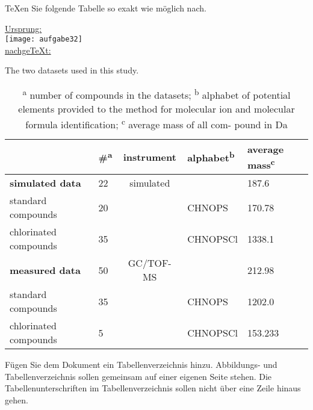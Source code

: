 \pagebreak
\begin{aufgabe}
\TeX en Sie folgende Tabelle so exakt wie m\"oglich nach.		
\end{aufgabe}
\FloatBarrier
\noindent \underline{Ursprung:} \\
\noindent\texttt{[image: aufgabe32]}
\\
\noindent \underline{nachge\TeX t:}\\
\indent
\begin{table}
\caption{The two datasets used in this study.}
\caption*{
\textsuperscript{a}\hspace{-1mm} number of compounds in the datasets; 
\textsuperscript{b}\hspace{-1mm} alphabet of potential elements provided 
				 to the method for molecular ion and molecular formula identification; 
\textsuperscript{c}\hspace{-1mm} average mass of all com- \-pound in Da 
}
\hspace*{0.48cm}
\begin{tabularx}{0.91\textwidth}{llcle{2}}
 \toprule 
				       & \#\textsuperscript{a} 
				       & instrument 
				       & alphabet\textsuperscript{b} 
				       & \textrm{average mass}\textsuperscript{c}\\
 \midrule
 \textbf{simulated data} 	       & 22	    & simulated  &              &  187.6\\
 \hspace{0.41cm} standard compounds    & 20	    & 		 & CHNOPS	& 170.78\\
 \hspace{0.41cm} chlorinated compounds & 35	    &            & CHNOPSCl     & 1338.1\\
 \midrule
 \textbf{measured data}	       	       & 50         & GC/TOF-MS  & 		& 212.98\\
 \hspace{0.41cm} standard compounds    & 35         & 		 & CHNOPS	& 1202.0\\
 \hspace{0.41cm} chlorinated compounds & 5	    &            & CHNOPSCl     & 153.233\\
 \bottomrule 
  \end{tabularx}
\end{table}

\pagebreak
\begin{aufgabe}
F\"ugen Sie dem Dokument ein Tabellenverzeichnis hinzu. Abbildungs- und Tabellenverzeichnis sollen gemeinsam auf einer eigenen Seite stehen. Die Tabellenunterschriften im Tabellenverzeichnis sollen nicht \"uber eine Zeile hinaus gehen.	
\end{aufgabe}
